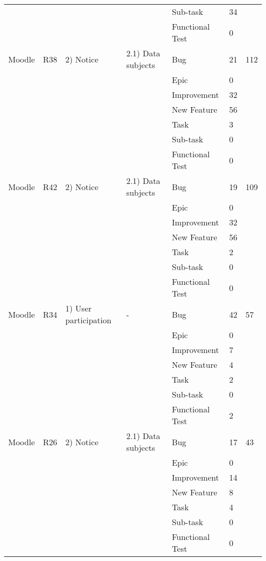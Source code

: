 \documentclass{article}
\begin{document}
\begin{table}[ht]
{\begin{tabular}{|l|l|l|l|l|l|l|}
		~ & ~ & ~ & ~ & Sub-task & 34 & ~ \\ 
		~ & ~ & ~ & ~ & Functional Test & 0 & ~ \\ \hline
		Moodle & R38 & 2) Notice & 2.1) Data subjects & Bug & 21 & 112 \\ 
		~ & ~ & ~ & ~ & Epic & 0 & ~ \\ 
		~ & ~ & ~ & ~ & Improvement & 32 & ~ \\ 
		~ & ~ & ~ & ~ & New Feature & 56 & ~ \\ 
		~ & ~ & ~ & ~ & Task & 3 & ~ \\ 
		~ & ~ & ~ & ~ & Sub-task & 0 & ~ \\ 
		~ & ~ & ~ & ~ & Functional Test & 0 & ~ \\ \hline
		Moodle & R42 & 2) Notice & 2.1) Data subjects & Bug & 19 & 109 \\ 
		~ & ~ & ~ & ~ & Epic & 0 & ~ \\ 
		~ & ~ & ~ & ~ & Improvement & 32 & ~ \\ 
		~ & ~ & ~ & ~ & New Feature & 56 & ~ \\ 
		~ & ~ & ~ & ~ & Task & 2 & ~ \\ 
		~ & ~ & ~ & ~ & Sub-task & 0 & ~ \\ 
		~ & ~ & ~ & ~ & Functional Test & 0 & ~ \\ \hline
		Moodle & R34 & 1) User participation & - & Bug & 42 & 57 \\ 
		~ & ~ & ~ & ~ & Epic & 0 & ~ \\ 
		~ & ~ & ~ & ~ & Improvement & 7 & ~ \\ 
		~ & ~ & ~ & ~ & New Feature & 4 & ~ \\ 
		~ & ~ & ~ & ~ & Task & 2 & ~ \\ 
		~ & ~ & ~ & ~ & Sub-task & 0 & ~ \\ 
		~ & ~ & ~ & ~ & Functional Test & 2 & ~ \\ \hline
		Moodle & R26 & 2) Notice & 2.1) Data subjects & Bug & 17 & 43 \\ 
		~ & ~ & ~ & ~ & Epic & 0 & ~ \\ 
		~ & ~ & ~ & ~ & Improvement & 14 & ~ \\ 
		~ & ~ & ~ & ~ & New Feature & 8 & ~ \\ 
		~ & ~ & ~ & ~ & Task & 4 & ~ \\ 
		~ & ~ & ~ & ~ & Sub-task & 0 & ~ \\ 
		~ & ~ & ~ & ~ & Functional Test & 0 & ~ \\ \hline
	\end{tabular}%
}
\end{table}
\end{document}
